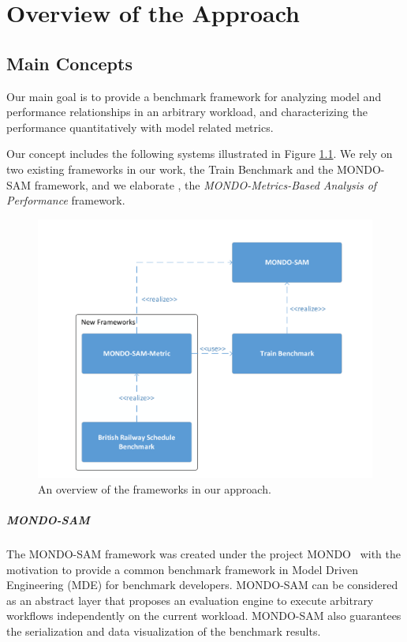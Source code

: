 \chapter{Overview of the Approach}

\section{Main Concepts}

Our main goal is to provide a benchmark framework for analyzing model and performance relationships in an arbitrary workload, and characterizing  the performance quantitatively with model related metrics.

Our concept includes the following systems illustrated in Figure \ref{fig:frameworks}. We rely on two existing frameworks in our work, the Train Benchmark and the MONDO-SAM framework, and we elaborate \framework, the \textit{MONDO-Metrics-Based Analysis of Performance} framework.
\begin{figure}[!ht]
	\centering
	\includegraphics[width=130mm, keepaspectratio]{figures/frameworks.pdf}
	\caption{An overview of the frameworks in our approach.}
	\label{fig:frameworks}
\end{figure}

\paragraph{MONDO-SAM}
The MONDO-SAM framework was created under the project MONDO~\cite{mondo} with the motivation to provide a common benchmark framework in Model Driven Engineering (MDE) for benchmark developers. MONDO-SAM can be considered as an abstract layer that proposes an evaluation engine to execute arbitrary workflows independently on the current workload. MONDO-SAM also guarantees the serialization and data visualization of the benchmark results.

